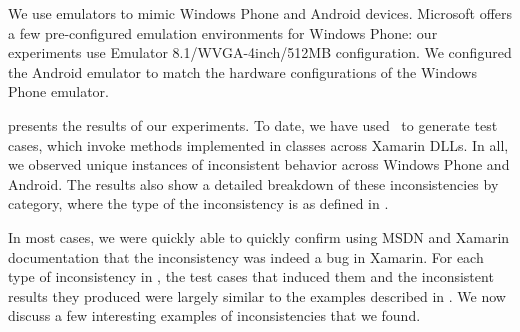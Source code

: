 We use emulators to mimic Windows Phone and Android devices. Microsoft offers a
few pre-configured emulation environments for Windows Phone: our experiments
use Emulator 8.1/WVGA-4inch/512MB configuration. We configured the Android
emulator to match the hardware configurations of the Windows Phone emulator.

%
 presents the results of our experiments.  To date,
we have used \tool\ to generate  test cases, which invoke
 methods implemented in  classes across
 Xamarin DLLs. In all, we observed  unique instances of
inconsistent behavior across Windows Phone and Android.  The results also show
a detailed breakdown of these inconsistencies by category, where the type of
the inconsistency is as defined in . 

In most cases, we were quickly able to quickly confirm using MSDN and Xamarin
documentation that the inconsistency was indeed a bug in Xamarin. For each type
of inconsistency in , the test cases that
induced them and the inconsistent results they produced were largely similar to
the examples described in . We now discuss a few
interesting examples of inconsistencies that we found.

